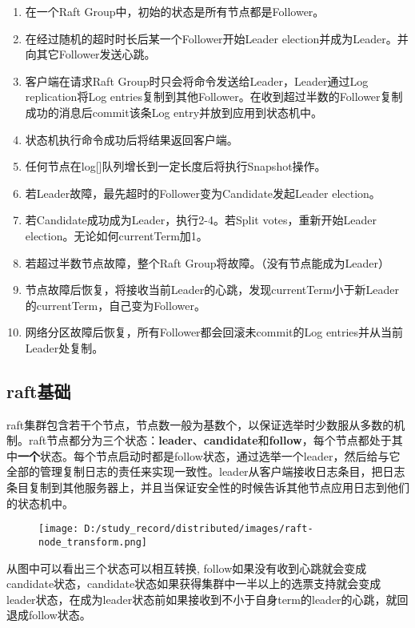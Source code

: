 \documentclass[
]{article}
\begin{document}
\begin{enumerate}
\def\labelenumi{\arabic{enumi}.}
\item
  在一个Raft Group中，初始的状态是所有节点都是Follower。
\item
  在经过随机的超时时长后某一个Follower开始Leader
  election并成为Leader。并向其它Follower发送心跳。
\item
  客户端在请求Raft Group时只会将命令发送给Leader，Leader通过Log
  replication将Log
  entries复制到其他Follower。在收到超过半数的Follower复制成功的消息后commit该条Log
  entry并放到应用到状态机中。
\item
  状态机执行命令成功后将结果返回客户端。
\item
  任何节点在log{[}{]}队列增长到一定长度后将执行Snapshot操作。
\item
  若Leader故障，最先超时的Follower变为Candidate发起Leader election。
\item
  若Candidate成功成为Leader，执行2-4。若Split votes，重新开始Leader
  election。无论如何currentTerm加1。
\item
  若超过半数节点故障，整个Raft Group将故障。（没有节点能成为Leader）
\item
  节点故障后恢复，将接收当前Leader的心跳，发现currentTerm小于新Leader的currentTerm，自己变为Follower。
\item
  网络分区故障后恢复，所有Follower都会回滚未commit的Log
  entries并从当前Leader处复制。
\end{enumerate}

\hypertarget{header-n38}{%
\subsection{raft基础}\label{header-n38}}

raft集群包含若干个节点，节点数一般为基数个，以保证选举时少数服从多数的机制。raft节点都分为三个状态：\textbf{leader}、\textbf{candidate}和\textbf{follow}，每个节点都处于其中\textbf{一个}状态。每个节点启动时都是follow状态，通过选举一个leader，然后给与它全部的管理复制日志的责任来实现一致性。leader从客户端接收日志条目，把日志条目复制到其他服务器上，并且当保证安全性的时候告诉其他节点应用日志到他们的状态机中。

\begin{figure}
\centering
\texttt{[image: D:/study\_record/distributed/images/raft-node\_transform.png]}
\caption{}
\end{figure}

从图中可以看出三个状态可以相互转换,
follow如果没有收到心跳就会变成candidate状态，candidate状态如果获得集群中一半以上的选票支持就会变成leader状态，在成为leader状态前如果接收到不小于自身term的leader的心跳，就回退成follow状态。
\end{document}
